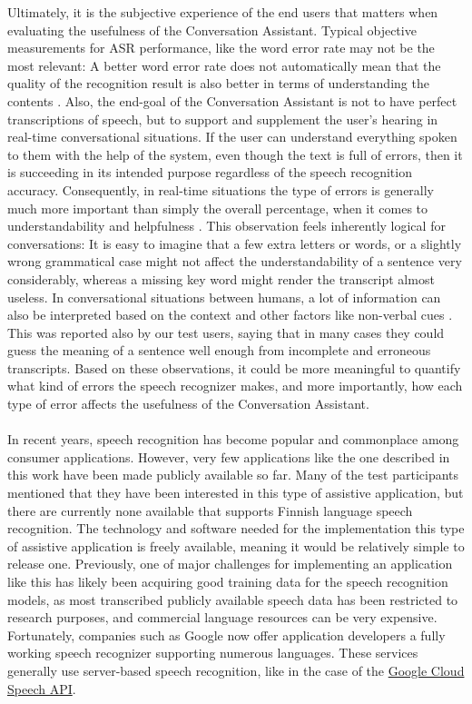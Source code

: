 \documentclass[english, 12pt, a4paper, pdftex, elec, utf8]{aaltothesis}
\begin{document}
Ultimately, it is the subjective experience of the end users that matters when evaluating the usefulness of the Conversation Assistant. Typical objective measurements for ASR performance, like the word error rate may not be the most relevant: A better word error rate does not automatically mean that the quality of the recognition result is also better in terms of understanding the contents \cite{wang2003word}. Also, the end-goal of the Conversation Assistant is not to have perfect transcriptions of speech, but to support and supplement the user's hearing in real-time conversational situations. If the user can understand everything spoken to them with the help of the system, even though the text is full of errors, then it is succeeding in its intended purpose regardless of the speech recognition accuracy. Consequently, in real-time situations the type of errors is generally much more important than simply the overall percentage, when it comes to understandability and helpfulness \cite{wang2003word}. This observation feels inherently logical for conversations: It is easy to imagine that a few extra letters or words, or a slightly wrong grammatical case might not affect the understandability of a sentence very considerably, whereas a missing key word might render the transcript almost useless. In conversational situations between humans, a lot of information can also be interpreted based on the context and other factors like non-verbal cues \cite{van2005transcription}. This was reported also by our test users, saying that in many cases they could guess the meaning of a sentence well enough from incomplete and erroneous transcripts. Based on these observations, it could be more meaningful to quantify what kind of errors the speech recognizer makes, and more importantly, how each type of error affects the usefulness of the Conversation Assistant. \\\\
In recent years, speech recognition has become popular and commonplace among consumer applications. However, very few applications like the one described in this work have been made publicly available so far. Many of the test participants mentioned that they have been interested in this type of assistive application, but there are currently none available that supports Finnish language speech recognition. The technology and software needed for the implementation this type of assistive application is freely available, meaning it would be relatively simple to release one. Previously, one of major challenges for implementing an application like this has likely been acquiring good training data for the speech recognition models, as most transcribed publicly available speech data has been restricted to research purposes, and commercial language resources can be very expensive. Fortunately, companies such as Google now offer application developers a fully working speech recognizer supporting numerous languages. These services generally use server-based speech recognition, like in the case of the \href{https://cloud.google.com/speech/}{Google Cloud Speech API}. \\\\
\end{document}
